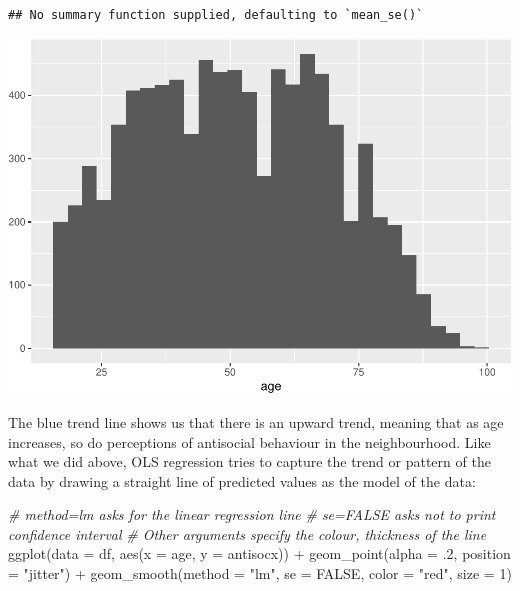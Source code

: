 \documentclass[
]{book}
\newenvironment{Shaded}{\begin{snugshade}}{\end{snugshade}}
\newcommand{\AttributeTok}[1]{\textcolor[rgb]{0.77,0.63,0.00}{#1}}
\newcommand{\CommentTok}[1]{\textcolor[rgb]{0.56,0.35,0.01}{\textit{#1}}}
\newcommand{\ConstantTok}[1]{\textcolor[rgb]{0.00,0.00,0.00}{#1}}
\newcommand{\DecValTok}[1]{\textcolor[rgb]{0.00,0.00,0.81}{#1}}
\newcommand{\FunctionTok}[1]{\textcolor[rgb]{0.00,0.00,0.00}{#1}}
\newcommand{\NormalTok}[1]{#1}
\newcommand{\SpecialCharTok}[1]{\textcolor[rgb]{0.00,0.00,0.00}{#1}}
\newcommand{\StringTok}[1]{\textcolor[rgb]{0.31,0.60,0.02}{#1}}
\begin{document}
\begin{verbatim}
## No summary function supplied, defaulting to `mean_se()`
\end{verbatim}

\includegraphics{09-regression_files/figure-latex/unnamed-chunk-6-1.pdf}

The blue trend line shows us that there is an upward trend, meaning that as age increases, so do perceptions of antisocial behaviour in the neighbourhood. Like what we did above, OLS regression tries to capture the trend or pattern of the data by drawing a straight line of predicted values as the model of the data:

\begin{Shaded}
\begin{Highlighting}[]
\CommentTok{\# method=lm asks for the linear regression line }
\CommentTok{\# se=FALSE asks not to print confidence interval }
\CommentTok{\# Other arguments specify the colour, thickness of the line }
\FunctionTok{ggplot}\NormalTok{(}\AttributeTok{data =}\NormalTok{ df, }\FunctionTok{aes}\NormalTok{(}\AttributeTok{x =}\NormalTok{ age, }\AttributeTok{y =}\NormalTok{ antisocx)) }\SpecialCharTok{+} 
  \FunctionTok{geom\_point}\NormalTok{(}\AttributeTok{alpha =}\NormalTok{ .}\DecValTok{2}\NormalTok{, }\AttributeTok{position =} \StringTok{"jitter"}\NormalTok{) }\SpecialCharTok{+} 
  \FunctionTok{geom\_smooth}\NormalTok{(}\AttributeTok{method =} \StringTok{"lm"}\NormalTok{, }\AttributeTok{se =} \ConstantTok{FALSE}\NormalTok{, }\AttributeTok{color =} \StringTok{"red"}\NormalTok{, }\AttributeTok{size =} \DecValTok{1}\NormalTok{)}
\end{Highlighting}
\end{Shaded}
\end{document}
